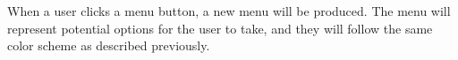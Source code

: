 
When a user clicks a menu button, a new menu will be produced.
The menu will represent potential options for the user to take, and they will follow the same color scheme as described previously.

